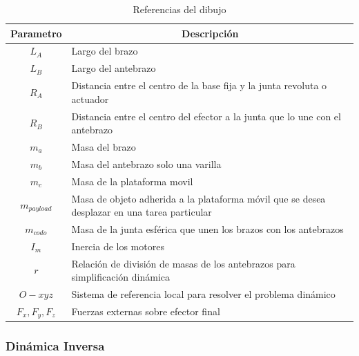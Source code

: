         \begingroup
            \renewcommand{\arraystretch}{1.5}
            \begin{table}[H]
            \centering
            \begin{tabular}{c m{12cm}}
               \hline
               \textbf{Parametro}  & \multicolumn{1}{c}{\textbf{Descripción}}  \\
               \hline           \hline            
             $L_A$ & Largo del brazo \\
            \hline
             $L_B$ & Largo del antebrazo \\
            \hline
             $R_A$ & Distancia entre el centro de la base fija y la junta revoluta o actuador \\
            \hline
             $R_B$ & Distancia entre el centro del efector a la junta que lo une con el antebrazo\\
            \hline
            $m_{a}$ & Masa del brazo\\
            \hline
            $m_{b}$ & Masa del antebrazo solo una varilla\\
            \hline
            $m_{c}$ & Masa de la plataforma movil\\
            \hline
            $m_{payload}$ & Masa de objeto adherida a la plataforma móvil que se desea desplazar en una tarea particular\\
            \hline
            $m_{codo}$ & Masa de la junta esférica que unen los brazos con los antebrazos\\
            \hline
            $I_{m}$ & Inercia de los motores\\
            \hline
            $r$ & Relación de división de masas de los antebrazos para simplificación dinámica\\
            \hline
            ${O} - xyz$ & Sistema de referencia local para resolver el problema dinámico\\
            \hline
             $F_{x},F_{y},F_{z}$ & Fuerzas externas sobre efector final\\
            \hline
            \end{tabular}
            \caption{Referencias del dibujo}
           \label{tab:cap4_tabla_13}
        \end{table}
        \endgroup     

\newpage


        \subsubsection{Dinámica Inversa}

